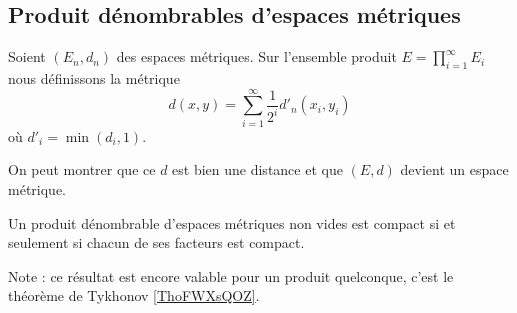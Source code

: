 \subsection{Produit dénombrables d'espaces métriques}

\begin{definition}
    Soient \( (E_n,d_n)\) des espaces métriques. Sur l'ensemble produit \( E=\prod_{i=1}^{\infty}E_i\) nous définissons la métrique
    \begin{equation}
        d(x,y)=\sum_{i=1}^{\infty}\frac{1}{ 2^i }d'_n(x_i,y_i)
    \end{equation}
    où \( d'_i=\min(d_i,1)\).
\end{definition}
On peut montrer que ce \( d\) est bien une distance et que \( (E,d)\) devient un espace métrique.

\begin{theorem}\label{ThoCDhbZbf}
    Un produit dénombrable d'espaces métriques non vides est compact si et seulement si chacun de ses facteurs est compact.
\end{theorem}
Note : ce résultat est encore valable pour un produit quelconque, c'est le théorème de Tykhonov \ref{ThoFWXsQOZ}.

